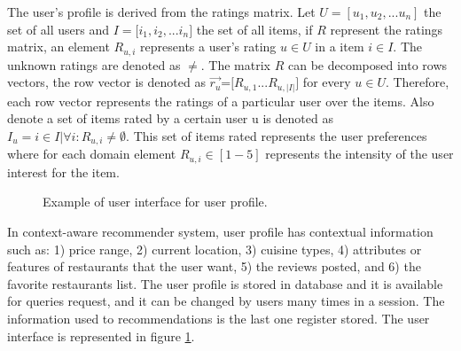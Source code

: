 The user's profile is derived from the ratings matrix. Let $U=[u_1,u_2,...u_n]$
the set of all users and $ I=[i_1,i_2,$...$i_n] $ the set of all items, if $R$
represent the ratings matrix,  an element  $R_{u,i}$ represents a user’s rating
$u \in U$  in a item $i \in I$.  The unknown ratings are denoted as $\neq $. The
matrix $R$ can be decomposed into rows vectors, the row vector is denoted as $
\overrightarrow{r_u} $=$[R_{u,1}$...$R_{u,|I|}]$ for every $u \in U$. Therefore,
each row vector represents the ratings of a particular user over the items. Also
denote a set of items rated by a certain user u is denoted as $ I_u = i \in I |
\forall  i: R_{u,i} \neq \emptyset $. This set of items rated represents the
user preferences where for each domain element $R_{u,i} \in [1-5]$ represents
the intensity of the user interest for  the item.\\  
\begin{figure}
\captionsetup{justification=centering,margin=2cm}
\centering
\setlength\fboxsep{0pt}
\caption{Example of user interface for user profile.}
\label{fig:user-profile}       %
\end{figure}
In context-aware recommender system, user profile has contextual
information such as: 1) price range, 2) current location, 3) cuisine
types, 4) attributes or features of restaurants that the user want, 5)
the reviews posted, and 6) the favorite restaurants list. The user
profile is stored in database and it is available for queries request,
and it can be changed by users many times in a session. The
information used to recommendations is the last one register stored.
The user interface is represented in figure \ref{fig:user-profile}.

